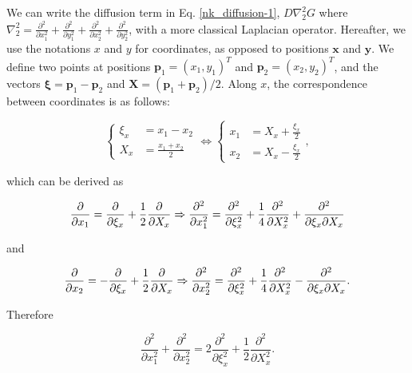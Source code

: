 We can write the diffusion term in Eq. \ref{nk_diffusion-1}, $D\nabla_{2}^{2}G$
where $\nabla_{2}^{2}=\frac{\partial^{2}}{\partial x_{1}^{2}}+\frac{\partial^{2}}{\partial y_{1}^{2}}+\frac{\partial^{2}}{\partial x_{2}^{2}}+\frac{\partial^{2}}{\partial y_{2}^{2}}$,
with a more classical Laplacian operator. Hereafter, we use the notations $x$ and $y$ for coordinates, as opposed to positions $\boldsymbol{x}$ and $\boldsymbol{y}$. We define two points at
positions $\mathbf{p}_{1}=(x_{1},y_{1})^{T}$ and $\mathbf{p}_{2}=(x_{2},y_{2})^{T}$,
and the vectors $\boldsymbol{\xi}=\mathbf{p}_{1}-\mathbf{p}_{2}$
and $\mathbf{\ensuremath{X=}}\left(\mathbf{p}_{1}+\mathbf{p}_{2}\right)/2$.
Along $x$, the correspondence between coordinates is as follows:

\begin{equation}
\begin{cases}
\xi_{x} & =x_{1}-x_{2}\\
X_{x} & =\frac{x_{1}+x_{2}}{2}
\end{cases}\Leftrightarrow\begin{cases}
x_{1} & =X_{x}+\frac{\xi_{x}}{2}\\
x_{2} & =X_{x}-\frac{\xi_{x}}{2}
\end{cases},
\end{equation}

which can be derived as

\begin{equation}
\frac{\text{\ensuremath{\partial}}}{\partial x_{1}}=\frac{\partial}{\partial\xi_{x}}+\frac{1}{2}\frac{\partial}{\partial X_{x}}\Rightarrow\frac{\text{\ensuremath{\partial^{2}}}}{\partial x_{1}^{2}}=\frac{\partial^{2}}{\partial\xi_{x}^{2}}+\frac{1}{4}\frac{\partial^{2}}{\partial X_{x}^{2}}+\frac{\partial^{2}}{\partial\xi_{x}\partial X_{x}}
\end{equation}

and

\begin{equation}
\frac{\text{\ensuremath{\partial}}}{\partial x_{2}}=-\frac{\partial}{\partial\xi_{x}}+\frac{1}{2}\frac{\partial}{\partial X_{x}}\Rightarrow\frac{\text{\ensuremath{\partial^{2}}}}{\partial x_{2}^{2}}=\frac{\partial^{2}}{\partial\xi_{x}^{2}}+\frac{1}{4}\frac{\partial^{2}}{\partial X_{x}^{2}}-\frac{\partial^{2}}{\partial\xi_{x}\partial X_{x}}.
\end{equation}

Therefore

\begin{equation}
\frac{\partial^{2}}{\partial x_{1}^{2}}+\frac{\partial^{2}}{\partial x_{2}^{2}}=2\frac{\partial^{2}}{\partial\xi_{x}^{2}}+\frac{1}{2}\frac{\partial^{2}}{\partial X_{x}^{2}}.
\end{equation}

